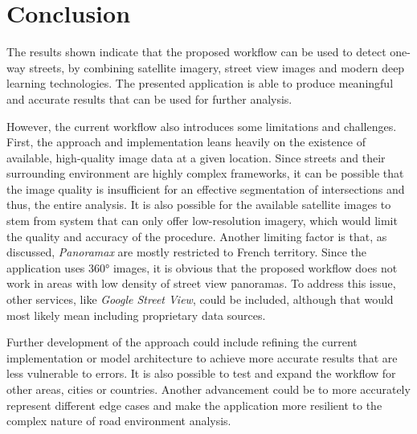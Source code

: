 \section{Conclusion}

The results shown indicate that the proposed workflow can be used to detect
one-way streets, by combining satellite imagery, street view images and modern
deep learning technologies. The presented application is able to produce
meaningful and accurate results that can be used for further analysis.

However, the current workflow also introduces some limitations and challenges.
First, the approach and implementation leans heavily on the existence of
available, high-quality image data at a given location. Since streets and their
surrounding environment are highly complex frameworks, it can be possible that
the image quality is insufficient for an effective segmentation of intersections
and thus, the entire analysis.
It is also possible for the available satellite images to stem from system that
can only offer low-resolution imagery, which would limit the quality and
accuracy of the procedure.
Another limiting factor is that, as discussed, \textit{Panoramax} are mostly
restricted to French territory.
Since the application uses 360° images, it is obvious that the proposed workflow
does not work in areas with low density of street view panoramas.
To address this issue, other services, like \textit{Google Street View}, could be
included, although that would most likely mean including proprietary data sources.

Further development of the approach could include refining the current
implementation or model architecture to achieve more accurate results that are
less vulnerable to errors.
It is also possible to test and expand the workflow for other areas, cities or
countries. Another advancement could be to more accurately represent different
edge cases and make the application more resilient to the complex nature of road
environment analysis.
